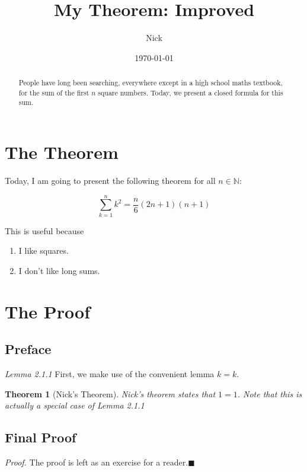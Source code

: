 \documentclass{article}
\title{My Theorem: Improved}
\author{Nick}
\date{\today}
\newtheorem{theorem}{Theorem}[section]
\begin{document}
\maketitle

\begin{abstract}
    People have long been searching, everywhere except in a high school maths textbook, for the sum of the first $n$ square numbers. Today, we present a closed formula for this sum.
\end{abstract}

\section{The Theorem}

Today, I am going to present the following theorem for all $n\in\mathbb{N}$:

\[
    \sum^n_{k=1}k^2=\frac{n}{6}(2n+1)(n+1)
\]

This is useful because
\begin{enumerate}
    \item I like squares.
    \item I don't like long sums.
\end{enumerate}

\section{The Proof}

\subsection{Preface}

\textit{Lemma 2.1.1} First, we make use of the convenient lemma $k=k$.

\begin{theorem}[Nick's Theorem]
    Nick's theorem states that $1=1$. Note that this is actually a special case of \textit{Lemma 2.1.1}
\end{theorem}

\subsection{Final Proof}

\textit{Proof.} The proof is left as an exercise for a reader.\hfill$\blacksquare$
\end{document}
